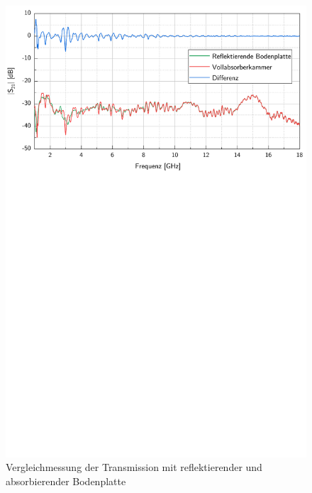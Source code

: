 \begin{figure}[ht]
    \centering
    \includegraphics[page=1, width=.99\textwidth, trim = 0cm 15.6cm 0cm 0cm]{Abbildungen/Kapitel4/Messergebnisse/Vergleich Absorber unter Reflektor.pdf}
    \caption{Vergleichmessung der Transmission mit reflektierender und absorbierender Bodenplatte}
    \label{fig:4_Vergleich_Absorber_unter_Reflektor}
\end{figure}


